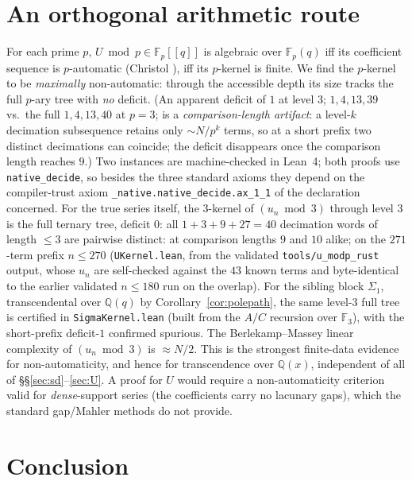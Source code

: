 \documentclass[11pt]{article}
\theoremstyle{plain}
\theoremstyle{definition}
\theoremstyle{remark}
\newcommand{\Q}{\mathbb{Q}}
\newcommand{\F}{\mathbb{F}}
\begin{document}
\section{An orthogonal arithmetic route}\label{sec:modp}

For each prime $p$, $U\bmod p\in\F_p[[q]]$ is algebraic over $\F_p(q)$ iff its coefficient sequence
is $p$-automatic (Christol \cite{Christol1979,CKMR1980}), iff its $p$-kernel is finite. We find the $p$-kernel
to be \emph{maximally} non-automatic: through the accessible depth its size tracks the full $p$-ary
tree with \emph{no} deficit. (An apparent deficit of $1$ at level $3$; $1,4,13,39$ vs.\ the full
$1,4,13,40$ at $p=3$; is a \emph{comparison-length artifact}: a level-$k$ decimation subsequence
retains only $\sim N/p^{k}$ terms, so at a short prefix two distinct decimations can coincide; the
deficit disappears once the comparison length reaches $9$.) Two instances are machine-checked in
Lean~4; both proofs use \texttt{native\_decide}, so besides the three standard axioms they depend
on the compiler-trust axiom \texttt{\_native.native\_decide.ax\_1\_1} of the declaration concerned.
For the true series itself, the $3$-kernel of $(u_n\bmod3)$ through level $3$ is the full
ternary tree, deficit $0$: all $1+3+9+27=40$ decimation words of length $\le3$ are pairwise distinct: at comparison lengths $9$ and $10$ alike; on the $271$-term prefix $n\le270$
(\texttt{UKernel.lean}, from the validated \texttt{tools/u\_modp\_rust} output, whose $u_n$ are
self-checked against the $43$ known terms and byte-identical to the earlier validated $n\le180$ run
on the overlap). For the sibling block $\Sigma_1$, transcendental over $\Q(q)$ by
Corollary~\ref{cor:polepath}, the same level-$3$ full tree is certified in \texttt{SigmaKernel.lean}
(built from the $A/C$ recursion over $\F_3$), with the short-prefix deficit-$1$ confirmed spurious. The Berlekamp--Massey \cite{Massey1969} linear complexity of $(u_n\bmod 3)$ is $\approx N/2$. This is the
strongest finite-data evidence for non-automaticity, and hence for transcendence over $\Q(x)$,
independent of all of \S\S\ref{sec:sd}--\ref{sec:U}. A proof for $U$ would require a non-automaticity
criterion valid for \emph{dense}-support series (the coefficients carry no lacunary gaps), which
the standard gap/Mahler methods do not provide.

\section{Conclusion}\label{sec:conclusion}
\end{document}
